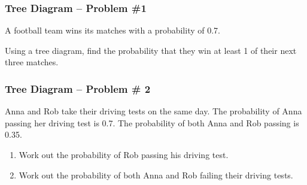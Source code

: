 \documentclass[aspectratio=169,11pt,usenames,dvipsnames]{beamer}
\begin{document}
\begin{frame}
 \frametitle{Tree Diagram -- Problem \#1}
 A football team wins its matches with a probability of 0.7.

 Using a tree diagram, find the probability that they win at least 1 of their
 next three matches.
\end{frame}

\begin{frame}
 \frametitle{Tree Diagram -- Problem \# 2}
 Anna and Rob take their driving tests on the same day. The probability of Anna
 passing her driving test is 0.7. The probability of both Anna and Rob passing
 is 0.35.

 \begin{enumerate}
  \item Work out the probability of Rob passing his driving test.
  \item Work out the probability of both Anna and Rob failing their driving
   tests.
 \end{enumerate}
\end{frame}
\end{document}
